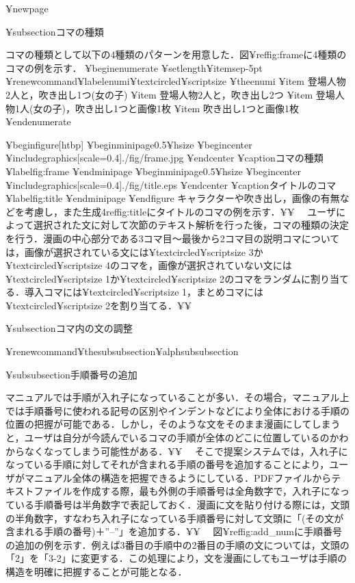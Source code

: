 ¥newpage

¥subsection{コマの種類}

コマの種類として以下の4種類のパターンを用意した．図¥ref{fig:frame}に4種類のコマの例を示す．
¥begin{enumerate}
¥setlength{¥itemsep}{-5pt}
¥renewcommand{¥labelenumi}{¥textcircled{¥scriptsize ¥theenumi}}
¥item 登場人物2人と，吹き出し1つ(女の子)
¥item 登場人物2人と，吹き出し2つ
¥item 登場人物1人(女の子)，吹き出し1つと画像1枚
¥item 吹き出し1つと画像1枚
¥end{enumerate}

¥begin{figure}[htbp]
 ¥begin{minipage}{0.5¥hsize}
  ¥begin{center}
   ¥includegraphics[scale=0.4]{./fig/frame.jpg}
  ¥end{center}
  ¥caption{コマの種類}
  ¥label{fig:frame}
 ¥end{minipage}
 ¥begin{minipage}{0.5¥hsize}
  ¥begin{center}
   ¥includegraphics[scale=0.4]{./fig/title.eps}
  ¥end{center}
  ¥caption{タイトルのコマ}
  ¥label{fig:title}
 ¥end{minipage}
¥end{figure}
キャラクターや吹き出し，画像の有無などを考慮し，また生成4ref{fig:title}にタイトルのコマの例を示す．¥¥
　ユーザによって選択された文に対して次節のテキスト解析を行った後，コマの種類の決定を行う．漫画の中心部分である3コマ目〜最後から2コマ目の説明コマについては，画像が選択されている文には¥textcircled{¥scriptsize 3}か¥textcircled{¥scriptsize 4}のコマを，画像が選択されていない文には¥textcircled{¥scriptsize 1}か¥textcircled{¥scriptsize 2}のコマをランダムに割り当てる．導入コマには¥textcircled{¥scriptsize 1}，まとめコマには¥textcircled{¥scriptsize 2}を割り当てる．¥¥

¥subsection{コマ内の文の調整}

¥renewcommand{¥thesubsubsection}{¥alph{subsubsection}}

¥subsubsection{手順番号の追加}

マニュアルでは手順が入れ子になっていることが多い．その場合，マニュアル上では手順番号に使われる記号の区別やインデントなどにより全体における手順の位置の把握が可能である．しかし，そのような文をそのまま漫画にしてしまうと，ユーザは自分が今読んでいるコマの手順が全体のどこに位置しているのかわからなくなってしまう可能性がある．¥¥
　そこで提案システムでは，入れ子になっている手順に対してそれが含まれる手順の番号を追加することにより，ユーザがマニュアル全体の構造を把握できるようにしている．PDFファイルからテキストファイルを作成する際，最も外側の手順番号は全角数字で，入れ子になっている手順番号は半角数字で表記しておく．漫画に文を貼り付ける際には，文頭の半角数字，すなわち入れ子になっている手順番号に対して文頭に「(その文が含まれる手順の番号)＋''--''」を追加する．¥¥
　図¥ref{fig:add\_num}に手順番号の追加の例を示す．例えば3番目の手順中の2番目の手順の文については，文頭の「2」を「3-2」に変更する．この処理により，文を漫画にしてもユーザは手順の構造を明確に把握することが可能となる．

